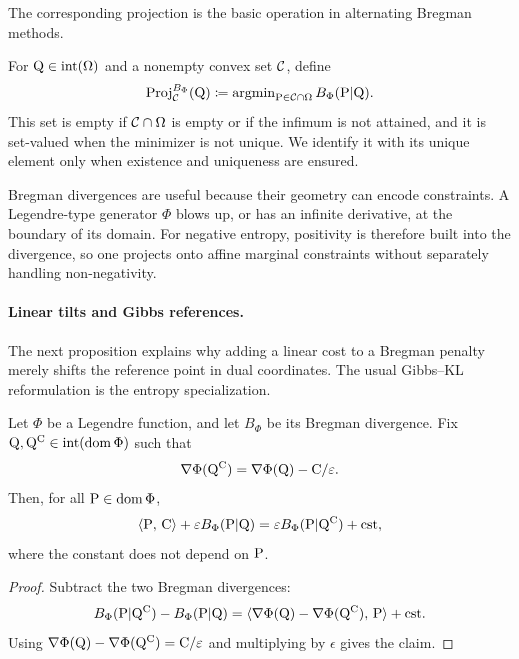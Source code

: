 The corresponding projection is the basic operation in alternating Bregman methods.
\begin{defn}\label{def-bregman-projection}
For $\Q\in\operatorname{int}(\Omega)$ and a nonempty convex set $\Cc$, define
\[
	\Proj_{\Cc}^{B_\Phi}(\Q)
	\eqdef
	\argmin_{\P\in\Cc\cap\Omega} B_\Phi(\P|\Q).
\]
This set is empty if $\Cc\cap\Omega$ is empty or if the infimum is not attained, and it is set-valued when the minimizer is not unique. We identify it with its unique element only when existence and uniqueness are ensured.
\end{defn}

Bregman divergences are useful because their geometry can encode constraints. A Legendre-type generator $\Phi$ blows up, or has an infinite derivative, at the boundary of its domain. For negative entropy, positivity is therefore built into the divergence, so one projects onto affine marginal constraints without separately handling non-negativity.

\paragraph{Linear tilts and Gibbs references.}

The next proposition explains why adding a linear cost to a Bregman penalty merely shifts the reference point in dual coordinates. The usual Gibbs--KL reformulation is the entropy specialization.

\begin{prop}\label{prop-bregman-linear-tilt}
	Let $\Phi$ be a Legendre function, and let $B_\Phi$ be its Bregman divergence. Fix $\Q,\Q^\C\in\operatorname{int}(\operatorname{dom}\Phi)$ such that
	\[
		\nabla\Phi(\Q^\C)=\nabla\Phi(\Q)-\C/\epsilon.
	\]
	Then, for all $\P\in\operatorname{dom}\Phi$,
	\[
		\dotp{\P}{\C}+\epsilon B_\Phi(\P|\Q)
		=
		\epsilon B_\Phi(\P|\Q^\C)+\text{\upshape cst},
	\]
	where the constant does not depend on $\P$.
\end{prop}
\begin{proof}
	Subtract the two Bregman divergences:
	\[
		B_\Phi(\P|\Q^\C)-B_\Phi(\P|\Q)
		=
		\dotp{\nabla\Phi(\Q)-\nabla\Phi(\Q^\C)}{\P}
		+\text{cst}.
	\]
	Using $\nabla\Phi(\Q)-\nabla\Phi(\Q^\C)=\C/\epsilon$ and multiplying by $\epsilon$ gives the claim.
\end{proof}

